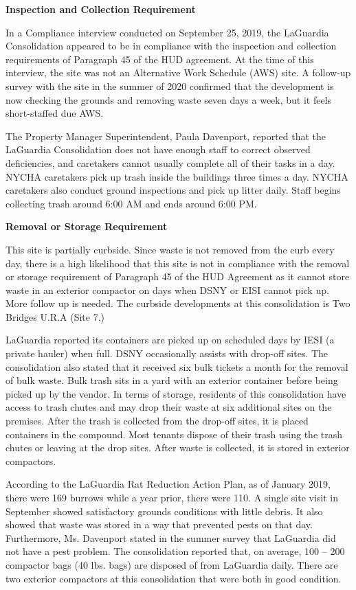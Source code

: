 
\textbf{Inspection and Collection Requirement}

In a Compliance interview conducted on September 25, 2019, the LaGuardia Consolidation appeared to be in compliance with the inspection and collection requirements of Paragraph 45 of the HUD agreement. At the time of this interview, the site was not an Alternative Work Schedule (AWS) site. A follow-up survey with the site in the summer of 2020 confirmed that the development is now checking the grounds and removing waste seven days a week, but it feels short-staffed due AWS. 

The Property Manager Superintendent, Paula Davenport, reported that the LaGuardia Consolidation does not have enough staff to correct observed deficiencies, and caretakers cannot usually complete all of their tasks in a day. NYCHA caretakers pick up trash inside the buildings three times a day. NYCHA caretakers also conduct ground inspections and pick up litter daily. Staff begins collecting trash around 6:00 AM and ends around 6:00 PM.

\textbf{Removal or Storage Requirement}

This site is partially curbside. Since waste is not removed from the curb every day, there is a high likelihood that this site is not in compliance with the removal or storage requirement of Paragraph  45 of the HUD Agreement as it cannot store waste in an exterior compactor on days when DSNY or EISI cannot pick up. More follow up is needed. The curbside developments at this consolidation is Two Bridges U.R.A (Site 7.)

LaGuardia reported its containers are picked up on scheduled days by IESI (a private hauler) when full. DSNY occasionally assists with drop-off sites.  The consolidation also stated that it received six bulk tickets a month for the removal of bulk waste. Bulk trash sits in a yard with an exterior container before being picked up by the vendor. In terms of storage, residents of this consolidation have access to trash chutes and may drop their waste at six additional sites on the premises. After the trash is collected from the drop-off sites, it is placed containers in the compound. Most tenants dispose of their trash using the trash chutes or leaving at the drop sites. After waste is collected, it is stored in exterior compactors.  

According to the LaGuardia Rat Reduction Action Plan, as of January 2019, there were 169 burrows while a year prior, there were 110. A single site visit in September showed satisfactory grounds conditions with little debris. It also showed that waste was stored in a way that prevented pests on that day. Furthermore, Ms. Davenport stated in the summer survey that LaGuardia did not have a pest problem. The consolidation reported that, on average, 100 -- 200 compactor bags (40 lbs. bags) are disposed of from LaGuardia daily. There are two exterior compactors at this consolidation that were both in good condition. 

